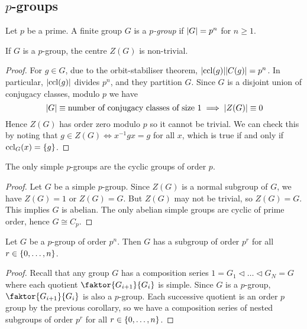 \subsection{\( p \)-groups}
\begin{definition}
	Let \( p \) be a prime.
	A finite group \( G \) is a \textit{\( p \)-group} if \( \abs{G} = p^n \) for \( n \geq 1 \).
\end{definition}
\begin{theorem}
	If \( G \) is a \( p \)-group, the centre \( Z(G) \) is non-trivial.
\end{theorem}
\begin{proof}
	For \( g \in G \), due to the orbit-stabiliser theorem, \( \abs{\operatorname{ccl}(g)} \abs{C(g)} = p^n \).
	In particular, \( \abs{\operatorname{ccl}(g)} \) divides \( p^n \), and they partition \( G \).
	Since \( G \) is a disjoint union of conjugacy classes, modulo \( p \) we have
	\[
		\abs{G} \equiv \text{number of conjugacy classes of size } 1 \implies \abs{Z(G)} \equiv 0
	\]
	Hence \( Z(G) \) has order zero modulo \( p \) so it cannot be trivial.
	We can check this by noting that \( g \in Z(G) \iff x^{-1} g x = g \) for all \( x \), which is true if and only if \( \operatorname{ccl}_G(x) = \qty{g} \).
\end{proof}
\begin{corollary}
	The only simple \( p \)-groups are the cyclic groups of order \( p \).
\end{corollary}
\begin{proof}
	Let \( G \) be a simple \( p \)-group.
	Since \( Z(G) \) is a normal subgroup of \( G \), we have \( Z(G) = 1 \) or \( Z(G) = G \).
	But \( Z(G) \) may not be trivial, so \( Z(G) = G \).
	This implies \( G \) is abelian.
	The only abelian simple groups are cyclic of prime order, hence \( G \cong C_p \).
\end{proof}
\begin{corollary}
	Let \( G \) be a \( p \)-group of order \( p^n \).
	Then \( G \) has a subgroup of order \( p^r \) for all \( r \in \qty{0, \dots, n} \).
\end{corollary}
\begin{proof}
	Recall that any group \( G \) has a composition series \( 1 = G_1 \triangleleft \dots \triangleleft G_N = G \) where each quotient \( \faktor{G_{i+1}}{G_i} \) is simple.
	Since \( G \) is a \( p \)-group, \( \faktor{G_{i+1}}{G_i} \) is also a \( p \)-group.
	Each successive quotient is an order \( p \) group by the previous corollary, so we have a composition series of nested subgroups of order \( p^r \) for all \( r \in \qty{0, \dots, n} \).
\end{proof}
